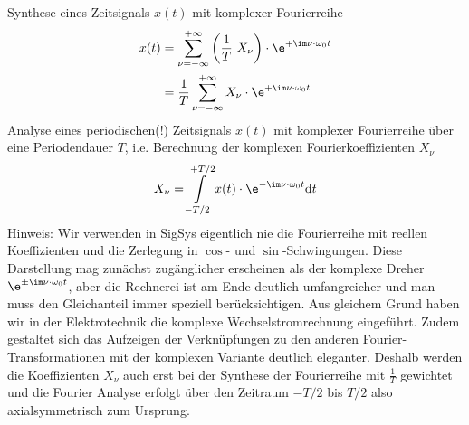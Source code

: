 \begin{Werkzeug}
Synthese eines Zeitsignals $x(t)$ mit komplexer Fourierreihe
%
\begin{align}
x(t)
&= \sum\limits_{\nu=-\infty}^{+\infty} \left(\frac{1}{T} \,\,X_\nu\right) \cdot \e^{+\im \nu \cdot \omega_0 t}\\
&= \frac{1}{T}\sum\limits_{\nu=-\infty}^{+\infty} X_\nu \cdot \e^{+\im \nu \cdot \omega_0 t}
\end{align}
%
Analyse eines periodischen(!) Zeitsignals $x(t)$ mit komplexer Fourierreihe über eine Periodendauer $T$, i.e.
Berechnung der komplexen Fourierkoeffizienten $X_\nu$
\begin{equation}
X_\nu =  \int\limits_{-T/2}^{+T/2} x(t) \cdot \e^{-\im \nu \cdot \omega_0 t} \mathrm{d}t
\end{equation}
%
Hinweis: Wir verwenden in SigSys eigentlich nie die Fourierreihe mit
reellen Koeffizienten und die Zerlegung in $\cos$- und $\sin$-Schwingungen.
%
Diese Darstellung mag zunächst zugänglicher erscheinen als der komplexe
Dreher $\e^{\pm\im \nu \cdot \omega_0 t}$, aber die Rechnerei ist am Ende deutlich
umfangreicher und man muss den Gleichanteil immer speziell berücksichtigen.
%
Aus gleichem Grund haben wir in der Elektrotechnik die komplexe
Wechselstromrechnung eingeführt.
%
Zudem gestaltet sich das Aufzeigen der Verknüpfungen zu den anderen
Fourier-Transformationen mit der komplexen Variante deutlich eleganter.
%
Deshalb werden die Koeffizienten $X_\nu$ auch erst bei der Synthese der
Fourierreihe mit $\frac{1}{T}$ gewichtet und die Fourier Analyse erfolgt über
den Zeitraum $-T/2$ bis $T/2$ also axialsymmetrisch zum Ursprung.
\end{Werkzeug}

